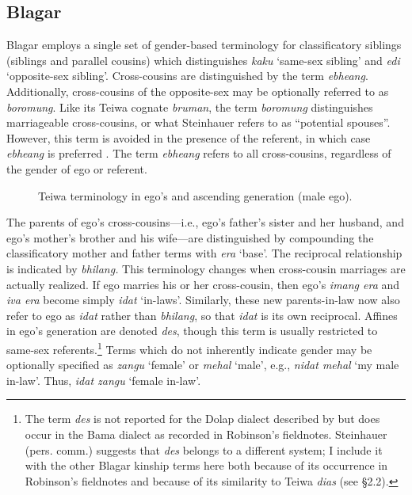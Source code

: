 \subsection{Blagar}
Blagar employs a single set of gender-based terminology for classificatory siblings (siblings and parallel cousins) which distinguishes \textit{kaku} `same-sex sibling' and \textit{edi} `opposite-sex sibling'. Cross-cousins are distinguished by the term \textit{ebheang}. Additionally, cross-cousins of the opposite-sex may be optionally referred to as \textit{boromung}. Like its Teiwa cognate \textit{bruman}, the term \textit{boromung} distinguishes marriageable cross-cousins, or what Steinhauer refers to as ``potential spouses''. However, this term is avoided in the presence of the referent, in which case \textit{ebheang} is preferred \citep[156]{Steinhauer1993}. The term \textit{ebheang} refers to all cross-cousins, regardless of the gender of ego or referent.


\begin{figure}
\caption{Teiwa terminology in ego's and ascending generation (male ego). }
\end{figure}




The parents of ego's cross-cousins---i.e., ego's father's sister and her husband, and ego's mother's brother and his wife---are distinguished by compounding the classificatory mother and father terms with \textit{era} `base'. The reciprocal relationship is indicated by \textit{bhilang.} This terminology changes when cross-cousin marriages are actually realized. If ego marries his or her cross-cousin, then ego's \textit{imang era} and \textit{iva era} become simply \textit{idat} `in-laws'. Similarly, these new parents-in-law now also refer to ego as \textit{idat} rather than \textit{bhilang}, so that \textit{idat} is its own reciprocal. Affines in ego's generation are denoted \textit{des}, though this term is usually restricted to same-sex referents.\footnote{{ }  The term \textit{des} is not reported for the Dolap dialect described by \citet{Steinhauer1993} but does occur in the Bama dialect as recorded in Robinson's fieldnotes. Steinhauer (pers. comm.) suggests that \textit{des} belongs to a different system; I include it with the other Blagar kinship terms here both because of its occurrence in Robinson's fieldnotes and because of its similarity to Teiwa \textit{dias} (see {\S}2.2).} Terms which do not inherently indicate gender may be optionally specified as \textit{zangu} `female' or \textit{mehal} `male', e.g., \textit{nidat mehal} `my male in-law'. Thus, \textit{idat zangu} `female in-law'.





